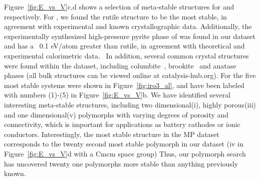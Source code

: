 Figure~\ref{fig:E_vs_V}c,d shows a selection of meta-stable structures for \IrOtwo and \IrOthree respectively.
%
For \IrOtwo, we found the rutile structure to be the most stable,
in agreement with experimental and known crystallographic data.
%
Additionally, the experimentally synthesized high-pressure pyrite phase of \IrOtwo was found in our dataset and has a \DHf ~0.1 eV/atom greater than rutile, in agreement with theoretical and experimental calorimetric data.~\cite{bolzan1997structural, shirako2014synthesis}
%
%
In addition, several common \ABtwo crystal structures were found within the dataset, including columbite~\cite{columbite}, brookite~\cite{brookite} and anatase~\cite{anatase} phases
(all bulk structures can be viewed online at catalysis-hub.org).
%
For \IrOthree the five most stable systems were shown in Figure~\ref{fig:iro3_al}, and have been labeled with numbers (1)-(5) in Figure~\ref{fig:E_vs_V}b.
%
We have identified several interesting meta-stable structures, including two dimensional(i), highly porous(iii) and one dimensional(v) polymorphs with varying degrees of porosity and connectivity,
which is important for applications as battery cathodes or ionic conductors.\cite{}
%
%
Interestingly, the most stable \IrOthree structure in the MP dataset~\cite{mp-1097041} corresponds to the twenty second most stable \IrOthree polymorph in our dataset
(iv in Figure~\ref{fig:E_vs_V}d with a Cmcm space group)
%
Thus, our polymorph search has uncovered twenty one \IrOthree polymorphs more stable than anything previously known.
